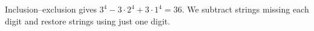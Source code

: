 Inclusion--exclusion gives $3^4-3\cdot2^4+3\cdot1^4=\boxed{36}$. We subtract strings missing each digit and restore strings using just one digit.
